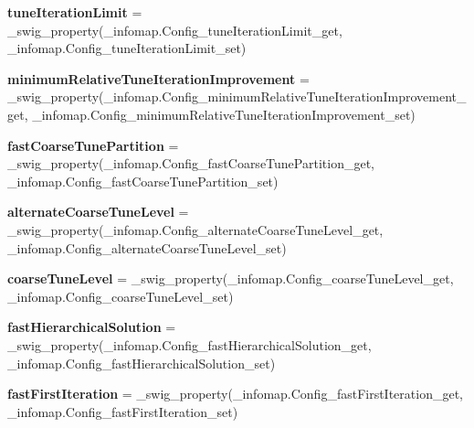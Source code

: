 \begin{DoxyCompactItemize}
\item 
\mbox{\label{classinfomap_1_1Config_a39afca5fbf97f4719e9f81fd77a4a7b0}} 
{\bfseries tune\+Iteration\+Limit} = \+\_\+swig\+\_\+property(\+\_\+infomap.\+Config\+\_\+tune\+Iteration\+Limit\+\_\+get, \+\_\+infomap.\+Config\+\_\+tune\+Iteration\+Limit\+\_\+set)
\item 
\mbox{\label{classinfomap_1_1Config_abca2a6c605ae7e65341c3a4f212da5bd}} 
{\bfseries minimum\+Relative\+Tune\+Iteration\+Improvement} = \+\_\+swig\+\_\+property(\+\_\+infomap.\+Config\+\_\+minimum\+Relative\+Tune\+Iteration\+Improvement\+\_\+get, \+\_\+infomap.\+Config\+\_\+minimum\+Relative\+Tune\+Iteration\+Improvement\+\_\+set)
\item 
\mbox{\label{classinfomap_1_1Config_affb453f7d32b5202b3e0570affdc177f}} 
{\bfseries fast\+Coarse\+Tune\+Partition} = \+\_\+swig\+\_\+property(\+\_\+infomap.\+Config\+\_\+fast\+Coarse\+Tune\+Partition\+\_\+get, \+\_\+infomap.\+Config\+\_\+fast\+Coarse\+Tune\+Partition\+\_\+set)
\item 
\mbox{\label{classinfomap_1_1Config_a61784c38a80f88abb54fba5c7b415144}} 
{\bfseries alternate\+Coarse\+Tune\+Level} = \+\_\+swig\+\_\+property(\+\_\+infomap.\+Config\+\_\+alternate\+Coarse\+Tune\+Level\+\_\+get, \+\_\+infomap.\+Config\+\_\+alternate\+Coarse\+Tune\+Level\+\_\+set)
\item 
\mbox{\label{classinfomap_1_1Config_af924310db7c82b3cdecf78bb4755c1f9}} 
{\bfseries coarse\+Tune\+Level} = \+\_\+swig\+\_\+property(\+\_\+infomap.\+Config\+\_\+coarse\+Tune\+Level\+\_\+get, \+\_\+infomap.\+Config\+\_\+coarse\+Tune\+Level\+\_\+set)
\item 
\mbox{\label{classinfomap_1_1Config_a46479c594b04fed29c04c71077bf8b76}} 
{\bfseries fast\+Hierarchical\+Solution} = \+\_\+swig\+\_\+property(\+\_\+infomap.\+Config\+\_\+fast\+Hierarchical\+Solution\+\_\+get, \+\_\+infomap.\+Config\+\_\+fast\+Hierarchical\+Solution\+\_\+set)
\item 
\mbox{\label{classinfomap_1_1Config_a77b4c3c16cd7c67a8938a0df491d322e}} 
{\bfseries fast\+First\+Iteration} = \+\_\+swig\+\_\+property(\+\_\+infomap.\+Config\+\_\+fast\+First\+Iteration\+\_\+get, \+\_\+infomap.\+Config\+\_\+fast\+First\+Iteration\+\_\+set)

\end{DoxyCompactItemize}
